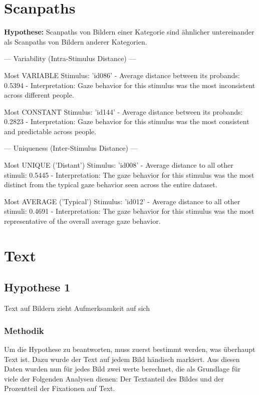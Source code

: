 \documentclass[
    language=german, %
    thesis=seminar, %
    supervisor=postdoc, %
    multiauthor=true, %
    ]{settings/csssa-thesis}
\begin{document}
\section{Scanpaths}
 
\textbf{Hypothese:} Scanpaths von Bildern einer Kategorie sind ähnlicher untereinander als Scanpaths von Bildern anderer Kategorien.

--- Variability (Intra-Stimulus Distance) ---
 
Most VARIABLE Stimulus:      'id086'
  - Average distance between its probands: 0.5394
  - Interpretation: Gaze behavior for this stimulus was the most inconsistent across different people.
 
Most CONSTANT Stimulus:      'id144'
  - Average distance between its probands: 0.2823
  - Interpretation: Gaze behavior for this stimulus was the most consistent and predictable across people.
 
 
--- Uniqueness (Inter-Stimulus Distance) ---
 
Most UNIQUE ('Distant') Stimulus: 'id008'
  - Average distance to all other stimuli: 0.5445
  - Interpretation: The gaze behavior for this stimulus was the most distinct from the typical gaze behavior seen across the entire dataset.
 
Most AVERAGE ('Typical') Stimulus: 'id012'
  - Average distance to all other stimuli: 0.4691
  - Interpretation: The gaze behavior for this stimulus was the most representative of the overall average gaze behavior.


\section{Text}

\subsection{Hypothese 1}
Text auf Bildern zieht Aufmerksamkeit auf sich

\subsubsection{Methodik}
Um die Hypothese zu beantworten, muss zuerst bestimmt werden, was überhaupt Text ist. 
Dazu wurde der Text auf jedem Bild händisch markiert. Aus diesen Daten wurden nun für 
jedes Bild zwei werte berechnet, die als Grundlage für viele der Folgenden Analysen dienen: 
Der Textanteil des Bildes und der Prozentteil der Fixationen auf Text. 
\end{document}
